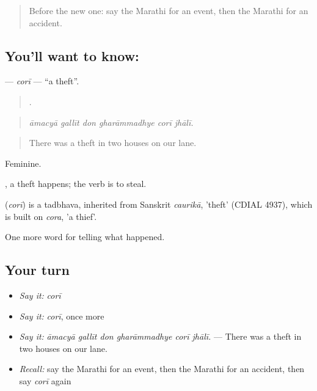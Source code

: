 \label{lesson:MR-C288-cori}



\begin{quote}
Before the new one: say the Marathi for an event, then the Marathi for an accident.
\end{quote}

\subsection*{You'll want to know: }
\textbf{} — \emph{corī} — \textquotedblleft{}a theft\textquotedblright{}.

\begin{quote}
     .
\end{quote}

\begin{quote}
\emph{āmacyā gallīt don gharāmmadhye corī jhālī.}
\end{quote}

\begin{quote}
There was a theft in two houses on our lane.
\end{quote}

Feminine.

 , a theft happens; the verb  is to steal.

\begin{cousinweb}
\textbf{} (\emph{corī}) is a tadbhava, inherited from Sanskrit \emph{caurikā}, 'theft' (CDIAL 4937), which is built on \emph{cora}, 'a thief'.
\end{cousinweb}

\begin{grammarlens}[title={What you've built}]
One more word for telling what happened.
\end{grammarlens}

\subsection*{Your turn}
\begin{itemize}
\raggedright
  \item \emph{Say it:} \emph{corī}
  \item \emph{Say it:} \emph{corī}, once more
  \item \emph{Say it:} \emph{āmacyā gallīt don gharāmmadhye corī jhālī.} — There was a theft in two houses on our lane.
  \item \emph{Recall:} say the Marathi for an event, then the Marathi for an accident, then say \emph{corī} again
\end{itemize}

